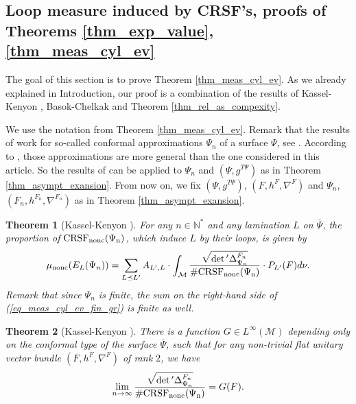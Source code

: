\documentclass[12pt]{article}
\numberwithin{equation}{section}
\theoremstyle{theorem}
\newtheorem{thm}{Theorem}[section]
\theoremstyle{definition}
\theoremstyle{remark}
\newcommand{\nat}{\mathbb{N}}
\newcommand{\laplcomp}{\Delta}
\begin{document}
\subsection{Loop measure induced by CRSF's, proofs of Theorems \ref{thm_exp_value}, \ref{thm_meas_cyl_ev}}\label{sect_cyl_event}
	The goal of this section is to prove Theorem \ref{thm_meas_cyl_ev}. As we already explained in Introduction, our proof is a combination of the results of Kassel-Kenyon \cite{KassKenyon}, Basok-Chelkak \cite{BasokChelk} and Theorem \ref{thm_rel_as_compexity}.
	\par 
	We use the notation from Theorem \ref{thm_meas_cyl_ev}. Remark that the results of \cite{KassKenyon} work for so-called conformal approximations $\Psi_n$ of a surface $\Psi$, see \cite[\S 4.1]{KassKenyon}.
	According to \cite[end of \S 4.1]{KassKenyon}, those approximations are more general than the one considered in this article.
	So the results of \cite{KassKenyon} can be applied to $\Psi_n$ and $(\Psi, g^{T \Psi})$ as in Theorem \ref{thm_asympt_exansion}.
	From now on, we fix $(\Psi, g^{T \Psi})$, $(F, h^F, \nabla^F)$ and $\Psi_n$, $(F_n, h^{F_n}, \nabla^{F_n})$ as in Theorem \ref{thm_asympt_exansion}.
	\begin{thm}[{Kassel-Kenyon \cite[Theorem 15, Lemma 16]{KassKenyon}}]\label{thm_kass_ken_prob}
		For any $n \in \nat^*$ and any lamination $L$ on $\overline{\Psi}$, the proportion of $\rm{CRSF}_{{\rm{nonc}}}(\Psi_n)$, which induce $L$ by their loops, is given by 
		\begin{equation}\label{eq_meas_cyl_ev_fin_gr}
			\mu_{\rm{nonc}}(E_L(\Psi_n)) = \sum_{L \preceq L'} A_{L', L} \cdot \int_{\mathcal{M}} \frac{\sqrt{\smash[b]{\det{}' \laplcomp_{\Psi_n}^{F_n}}}}{\# \rm{CRSF}_{{\rm{nonc}}}(\Psi_n)} \cdot P_{L'}(F) d \nu.
		\end{equation}
		Remark that since $\Psi_n$ is finite, the sum on the right-hand side of (\ref{eq_meas_cyl_ev_fin_gr}) is finite as well.
	\end{thm}
	\begin{thm}[{Kassel-Kenyon \cite[Theorem 17]{KassKenyon}}]\label{thm_kas_kenyon_conv}
		There is a function $G \in L^{\infty}(\mathcal{M})$ depending only on the conformal type of the surface $\overline{\Psi}$, such that for any non-trivial flat unitary vector bundle $(F, h^F, \nabla^F)$ of rank $2$, we have
		\begin{equation}\label{eq_kas_kenyon_conv2}
			\lim_{n \to \infty}
			\frac{\sqrt{\smash[b]{\det{}' \laplcomp_{\Psi_n}^{F_n}}}}{\# \rm{CRSF}_{{\rm{nonc}}}(\Psi_n)} 
			=
			G(F).
		\end{equation}
	\end{thm}
\end{document}
